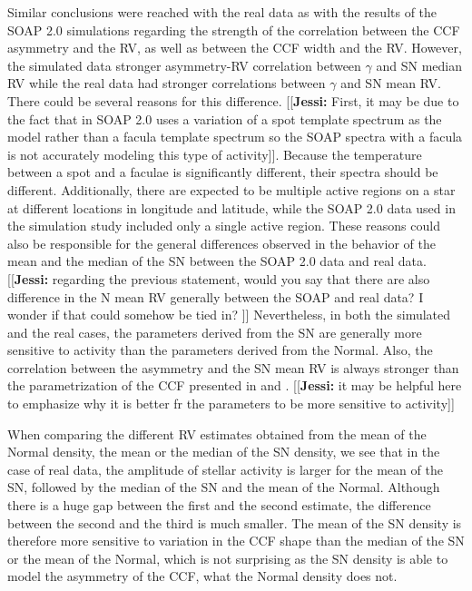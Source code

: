\documentclass{aa}
\newcommand{\jessi}[1]{{\color{Purple}[[\textbf{Jessi: }#1]]}}
\begin{document}
Similar conclusions were reached with the real data as with the results of the SOAP 2.0 simulations regarding the strength of the correlation between the CCF asymmetry and the RV, as well as between the CCF width and the RV. 
However, the simulated data stronger asymmetry-RV correlation between $\gamma$ and SN median RV while the real data had stronger correlations between $\gamma$ and SN mean RV. 
There could be several reasons for this difference.
\jessi{First, it may be due to the fact that in SOAP 2.0 uses a variation of a spot template spectrum as the model rather than a facula template spectrum so the SOAP spectra with a facula is not accurately modeling this type of activity}.  
Because the temperature between a spot and a faculae is significantly different, their spectra should be different. 
Additionally, there are expected to be multiple active regions on a star at different locations in longitude and latitude, while the SOAP 2.0 data used in the simulation study included only a single active region. 
These reasons could also be responsible for the general differences observed in the behavior of the mean and the median of the SN between the SOAP 2.0 data and real data. \jessi{regarding the previous statement, would you say that there are also difference in the N mean RV generally between the SOAP and real data?  I wonder if that could somehow be tied in? }
Nevertheless, in both the simulated and the real cases, the parameters derived from the SN are generally more sensitive to activity than the parameters derived from the Normal.  Also, the correlation between the asymmetry and the SN mean RV is always stronger than the parametrization of the CCF presented in \citet{Boisse-2011} and \citet{Figueira-2013}.  \jessi{it may be helpful here to emphasize why it is better fr the parameters to be more sensitive to activity}

When comparing the different RV estimates obtained from the mean of the Normal density, the mean or the median of the SN density, we see that in the case of real data, the amplitude of stellar activity is larger for the mean of the SN, followed by the median of the SN and the mean of the Normal. Although there is a huge gap between the first and the second estimate, the difference between the second and the third is much smaller. The mean of the SN density is therefore more sensitive to variation in the CCF shape than the median of the SN or the mean of the Normal, which is not surprising as the SN density is able to model the asymmetry of the CCF, what the Normal density does not. 
\end{document}
